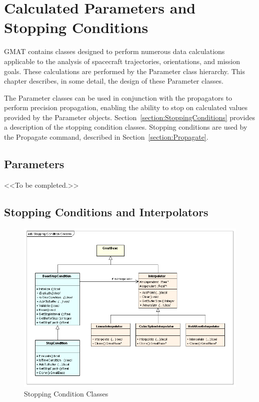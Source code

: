 \chapter{\label{chapter:Parameters}Calculated Parameters and Stopping Conditions}

GMAT contains classes designed to perform numerous data calculations applicable to the analysis of
spacecraft trajectories, orientations, and mission goals.  These calculations are performed by the
Parameter class hierarchy.  This chapter describes, in some detail, the design of these Parameter
classes.

The Parameter classes can be used in conjunction with the propagators to perform precision
propagation, enabling the ability to stop on calculated values provided by the Parameter objects.
Section~\ref{section:StoppingConditions} provides a description of the stopping condition classes.
Stopping conditions are used by the Propagate command, described in Section~\ref{section:Propagate}.

\section{\label{section:Parameters}Parameters}

<<To be completed.>>

\section{\label{section:StoppingConditions}Stopping Conditions and Interpolators}

\begin{figure}[htb]
\begin{center}
\includegraphics[380,284]{Images/StoppingConditionClasses.png}
\caption{\label{figure:StoppingConditionClasses}Stopping Condition Classes}
\end{center}
\end{figure}

